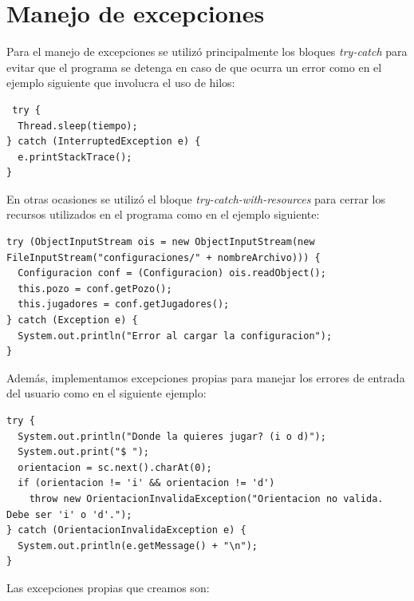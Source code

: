 \documentclass[12pt]{article}
\begin{document}
  \section{Manejo de excepciones}
  Para el manejo de excepciones se utilizó principalmente los bloques \textit{try-catch} para evitar que el programa se detenga en caso de que ocurra un error como en el ejemplo siguiente que involucra el uso de hilos:

  \begin{lstlisting}
 try {
  Thread.sleep(tiempo);
} catch (InterruptedException e) {
  e.printStackTrace();
}
  \end{lstlisting}

  En otras ocasiones se utilizó el bloque \textit{try-catch-with-resources} para cerrar los recursos utilizados en el programa como en el ejemplo siguiente:

  \begin{lstlisting}
try (ObjectInputStream ois = new ObjectInputStream(new FileInputStream("configuraciones/" + nombreArchivo))) {
  Configuracion conf = (Configuracion) ois.readObject();
  this.pozo = conf.getPozo();
  this.jugadores = conf.getJugadores();
} catch (Exception e) {
  System.out.println("Error al cargar la configuracion");
}
  \end{lstlisting}

  Además, implementamos excepciones propias para manejar los errores de entrada del usuario como en el siguiente ejemplo:

  \begin{lstlisting}
try {
  System.out.println("Donde la quieres jugar? (i o d)");
  System.out.print("$ ");
  orientacion = sc.next().charAt(0);
  if (orientacion != 'i' && orientacion != 'd') 
    throw new OrientacionInvalidaException("Orientacion no valida. Debe ser 'i' o 'd'.");
} catch (OrientacionInvalidaException e) {
  System.out.println(e.getMessage() + "\n");
}
  \end{lstlisting}

  Las excepciones propias que creamos son: 
\end{document}
